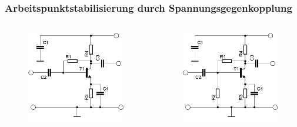 \begin{frame}
  \frametitle{Arbeitspunktstabilisierung durch Spannungsgegenkopplung}
  \begin{columns}
    \begin{center}
      \begin{figure}
        \includegraphics[width=\textwidth,height=.7\textheight,keepaspectratio]{a06/Transistor-Verstaerker-APstab2a.png}
      \end{figure}
    \end{center}
    \begin{center}
      \begin{figure}
        \includegraphics[width=\textwidth,height=.7\textheight,keepaspectratio]{a06/Transistor-Verstaerker-APstab2b.png}

\end{figure}
\end{center}
\end{columns}
\end{frame}
